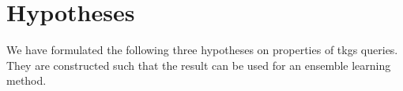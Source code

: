 \section{Hypotheses}
\label{sec:hypotheses}

We have formulated the following three hypotheses on properties of \glspl{tkg} queries.
They are constructed such that the result can be used for an ensemble learning method.

%

%
%

%

%